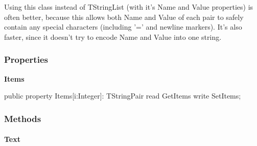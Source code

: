 \documentclass{report}
\newif\ifpdf
\begin{document}
Using this class instead of TStringList (with it's Name and Value properties) is often better, because this allows both Name and Value of each pair to safely contain any special characters (including '=' and newline markers). It's also faster, since it doesn't try to encode Name and Value into one string.\subsubsection*{\large{\textbf{Properties}}\normalsize\hspace{1ex}\hfill}
\begin{list}{}{
\setlength{\itemindent}{0cm}
\setlength{\listparindent}{0cm}
\setlength{\leftmargin}{\evensidemargin}
\addtolength{\leftmargin}{\tmplength}
\settowidth{\labelsep}{X}
\addtolength{\leftmargin}{\labelsep}
\setlength{\labelwidth}{\tmplength}
}
\label{PasDoc_StringPairVector.TStringPairVector-Items}
\item[\textbf{Items}\hfill]
\ifpdf
\begin{flushleft}
\fi
\begin{ttfamily}
public property Items[i:Integer]: TStringPair read GetItems write SetItems;\end{ttfamily}

\ifpdf
\end{flushleft}
\fi


\par  \end{list}
\subsubsection*{\large{\textbf{Methods}}\normalsize\hspace{1ex}\hfill}
\paragraph*{Text}\hspace*{\fill}
\end{document}
